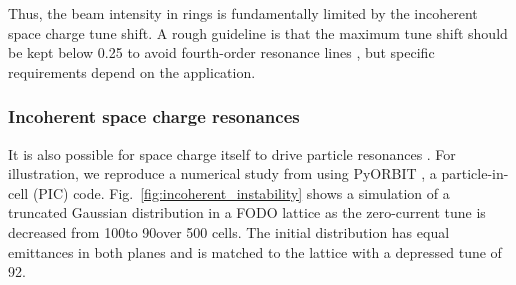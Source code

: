 Thus, the beam intensity in rings is fundamentally limited by the incoherent space charge tune shift. A rough guideline is that the maximum tune shift should be kept below 0.25 to avoid fourth-order resonance lines \cite{book:Reiser}, but specific requirements depend on the application.


\subsubsection{Incoherent space charge resonances}

%
It is also possible for space charge itself to drive particle resonances \cite{Holmes1999, Jeon1999, Li2014, Kojima2019, Asvesta2020}. For illustration, we reproduce a numerical study from \cite{Hofmann2017Book} using PyORBIT \cite{Shishlo2015}, a particle-in-cell (PIC) code. Fig.~\ref{fig:incoherent_instability} shows a simulation of a truncated Gaussian distribution in a FODO lattice as the zero-current tune is decreased from 100\degree to 90\degree over 500 cells. The initial distribution has equal emittances in both planes and is matched to the lattice with a depressed tune of 92\degree.
%
